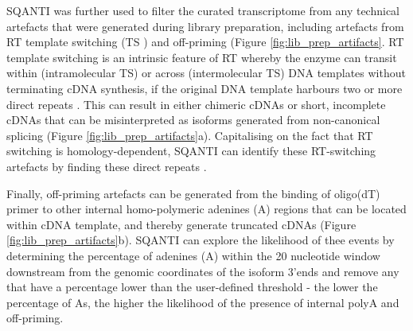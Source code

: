 SQANTI was further used to filter the curated transcriptome from any technical artefacts that were generated during library preparation, including artefacts from RT template switching (TS ) and off-priming \cite{Conesa2016} (Figure \ref{fig:lib_prep_artifacts}. RT template switching is an intrinsic feature of RT whereby the enzyme can transit within (intramolecular TS) or across (intermolecular TS) DNA templates without terminating cDNA synthesis, if the original DNA template harbours two or more direct repeats \cite{Cocquet2006}. This can result in either chimeric cDNAs or short, incomplete cDNAs that can be misinterpreted as isoforms generated from non-canonical splicing \cite{Houseley2010} (Figure \ref{fig:lib_prep_artifacts}a). Capitalising on the fact that RT switching is homology-dependent, SQANTI can identify these RT-switching artefacts by finding these direct repeats \cite{Conesa2016}. 

Finally, off-priming artefacts can be generated from the binding of oligo(dT) primer to other internal homo-polymeric adenines (A) regions that can be located within cDNA template, and thereby generate truncated cDNAs \cite{Nam2002} (Figure \ref{fig:lib_prep_artifacts}b). SQANTI can explore the likelihood of thee events by determining the percentage of adenines (A) within the 20 nucleotide window downstream from the genomic coordinates of the isoform 3'ends and remove any that have a percentage lower than the user-defined threshold \cite{Conesa2016} - the lower the percentage of As, the higher the likelihood of the presence of internal polyA and off-priming. 

